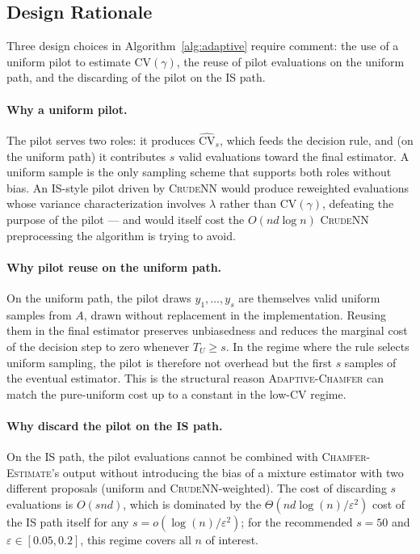 \documentclass[conference]{IEEEtran}
\begin{document}
\subsection{Design Rationale}
\label{sec:adaptive-design}

Three design choices in Algorithm~\ref{alg:adaptive} require comment:
the use of a uniform pilot to estimate $\mathrm{CV}(\gamma)$, the
reuse of pilot evaluations on the uniform path, and the discarding of
the pilot on the IS path.

\paragraph{Why a uniform pilot.}
The pilot serves two roles: it produces $\widehat{\mathrm{CV}}_s$,
which feeds the decision rule, and (on the uniform path) it
contributes $s$ valid evaluations toward the final estimator. A
uniform sample is the only sampling scheme that supports both roles
without bias. An IS-style pilot driven by \textsc{CrudeNN} would
produce reweighted evaluations whose variance characterization
involves $\lambda$ rather than $\mathrm{CV}(\gamma)$, defeating the
purpose of the pilot --- and would itself cost the
$O(nd \log n)$ \textsc{CrudeNN} preprocessing the algorithm is
trying to avoid.

\paragraph{Why pilot reuse on the uniform path.}
On the uniform path, the pilot draws $y_1, \dots, y_s$ are themselves
valid uniform samples from $A$, drawn without replacement in the
implementation. Reusing them in the final estimator preserves
unbiasedness and reduces the marginal cost of the decision step to zero
whenever $T_U \geq s$. In the regime where the rule selects
uniform sampling, the pilot is therefore not overhead but the first
$s$ samples of the eventual estimator. This is the structural reason
\textsc{Adaptive-Chamfer} can match the pure-uniform cost up to a
constant in the low-CV regime.

\paragraph{Why discard the pilot on the IS path.}
On the IS path, the pilot evaluations cannot be combined with
\textsc{Chamfer-Estimate}'s output without introducing the bias of a
mixture estimator with two different proposals (uniform and
\textsc{CrudeNN}-weighted). The cost of discarding $s$ evaluations is
$O(snd)$, which is dominated by the
$\Theta(nd \log(n) / \varepsilon^2)$ cost of the IS path itself for
any $s = o(\log(n) / \varepsilon^2)$; for the recommended $s = 50$
and $\varepsilon \in [0.05, 0.2]$, this regime covers all $n$ of
interest.
\end{document}
